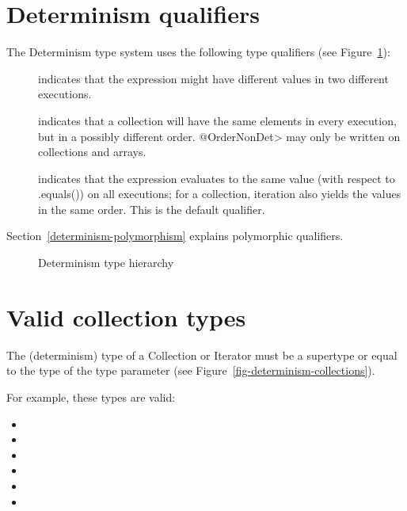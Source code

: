 \section{Determinism qualifiers\label{determinism-qualifiers}}

The Determinism type system uses the following type qualifiers (see Figure~\ref{fig-determinism-hierarchy}):
\begin{description}
\item[] indicates
  that the expression might have different values in two different executions.
\item[] indicates that
  a collection will have the same elements in every execution, but in a
  possibly different order.  \<@OrderNonDet> may only be written on
  collections and arrays.
\item[] indicates that
  the expression evaluates to the same value (with respect to .equals()) on all
  executions; for a collection, iteration also yields the values in the same
  order.
  This is the default qualifier.
\end{description}

Section~\ref{determinism-polymorphism} explains polymorphic qualifiers.

\begin{figure}
  \begin{center}
  \end{center}
\caption{Determinism type hierarchy}
\label{fig-determinism-hierarchy}
\end{figure}


\section{Valid collection types\label{determinism-collection-types}}

The (determinism) type of a Collection or Iterator must be a supertype or equal to
the type of the type parameter (see Figure~\ref{fig-determinism-collections}).

For example, these types are valid:
\begin{itemize}
    \item {}
    \item {}
    \item {}
    \item {}
    \item {}
    \item {}
\end{itemize}

